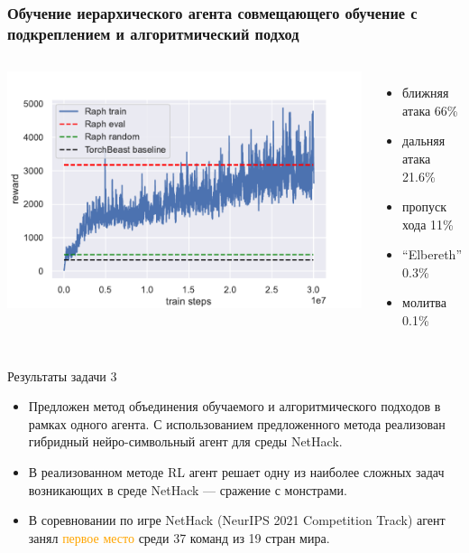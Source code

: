 \begin{frame}
\frametitle{Обучение иерархического агента совмещающего обучение с подкреплением и алгоритмический подход}
\begin{columns}
\centering
\includegraphics[width=1\linewidth]{images/raph_train.pdf}
\begin{itemize}
    \item ближняя атака 66\%
    \item дальняя атака 21.6\%
    \item пропуск хода 11\%
    \item ``Elbereth'' 0.3\%
    \item молитва 0.1\%
\end{itemize}
\end{columns}
\end{frame}


\begin{frame}{Результаты задачи 3}
\begin{itemize}
    \item[\textcolor{ForestGreen}{\checkmark}] Предложен метод объединения обучаемого и алгоритмического подходов в рамках одного агента. С использованием предложенного метода реализован гибридный нейро-символьный агент для среды NetHack.
    \item[\textcolor{ForestGreen}{\checkmark}] В реализованном методе RL агент решает одну из наиболее сложных задач возникающих в среде NetHack — сражение с монстрами.
    \item[\textcolor{ForestGreen}{\checkmark}] В соревновании по игре NetHack (NeurIPS 2021 Competition Track) агент занял \textcolor{orange}{первое место} среди 37 команд из 19 стран мира.
\end{itemize}
    
\end{frame}

